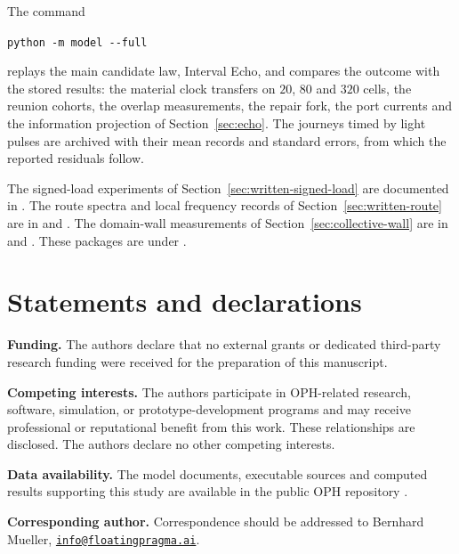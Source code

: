 \documentclass[11pt]{article}
\theoremstyle{definition}
\theoremstyle{remark}
\theoremstyle{plain}
\begin{document}
The command
\begin{center}
\texttt{python -m model -{}-full}
\end{center}
replays the main candidate law, Interval Echo, and compares the outcome
with the stored results: the material clock transfers on $20$, $80$ and
$320$ cells, the reunion cohorts, the overlap measurements, the repair
fork, the port currents and the information projection of
Section~\ref{sec:echo}. The journeys timed by light pulses are archived
with their mean records and standard errors, from which the reported
residuals follow.

The signed-load experiments of Section~\ref{sec:written-signed-load} are
documented in .
The route spectra and local frequency records of Section~\ref{sec:written-route}
are in  and .
The domain-wall measurements of Section~\ref{sec:collective-wall} are in
 and . These packages are under
.



\section*{Statements and declarations}

\noindent\textbf{Funding.}
The authors declare that no external grants or dedicated third-party research
funding were received for the preparation of this manuscript.

\noindent\textbf{Competing interests.}
The authors participate in OPH-related research, software, simulation, or
prototype-development programs and may receive professional or reputational
benefit from this work. These relationships are disclosed. The authors declare
no other competing interests.

\noindent\textbf{Data availability.}
The model documents, executable sources and computed results supporting this
study are available in the public OPH repository \cite{ophrepo}.

\noindent\textbf{Corresponding author.}
Correspondence should be addressed to Bernhard Mueller,
\href{mailto:info@floatingpragma.ai}{\nolinkurl{info@floatingpragma.ai}}.
\end{document}
